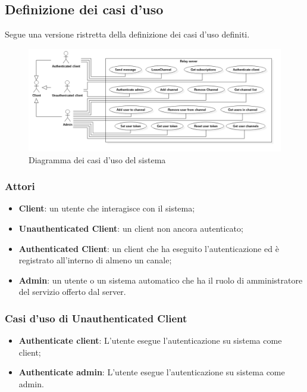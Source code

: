 	\subsection{Definizione dei casi d'uso}
		Segue una versione ristretta della definizione dei casi d'uso definiti.
		\begin{figure}[H]
			\begin{center}
			\includegraphics[width=16.5cm,keepaspectratio]{UML/png/Use Case Model__Use Cases_0}
			\caption{Diagramma dei casi d'uso del sistema}
			\end{center}
		\end{figure}

		\subsubsection{Attori}
		\begin{itemize}
			\item \textbf{Client}: un utente che interagisce con il sistema;
			\item \textbf{Unauthenticated Client}: un client non ancora autenticato;
			\item \textbf{Authenticated Client}: un client che ha eseguito l'autenticazione ed è registrato all'interno di almeno un canale;
			\item \textbf{Admin}: un utente o un sistema automatico che ha il ruolo di amministratore del servizio offerto dal server.
		\end{itemize}

		\subsubsection{Casi d'uso di Unauthenticated Client}
		\begin{itemize}
			\item \textbf{Authenticate client}: L'utente esegue l'autenticazione su sistema come client;
			\item \textbf{Authenticate admin}: L'utente esegue l'autenticazione su sistema come admin.
		\end{itemize}

